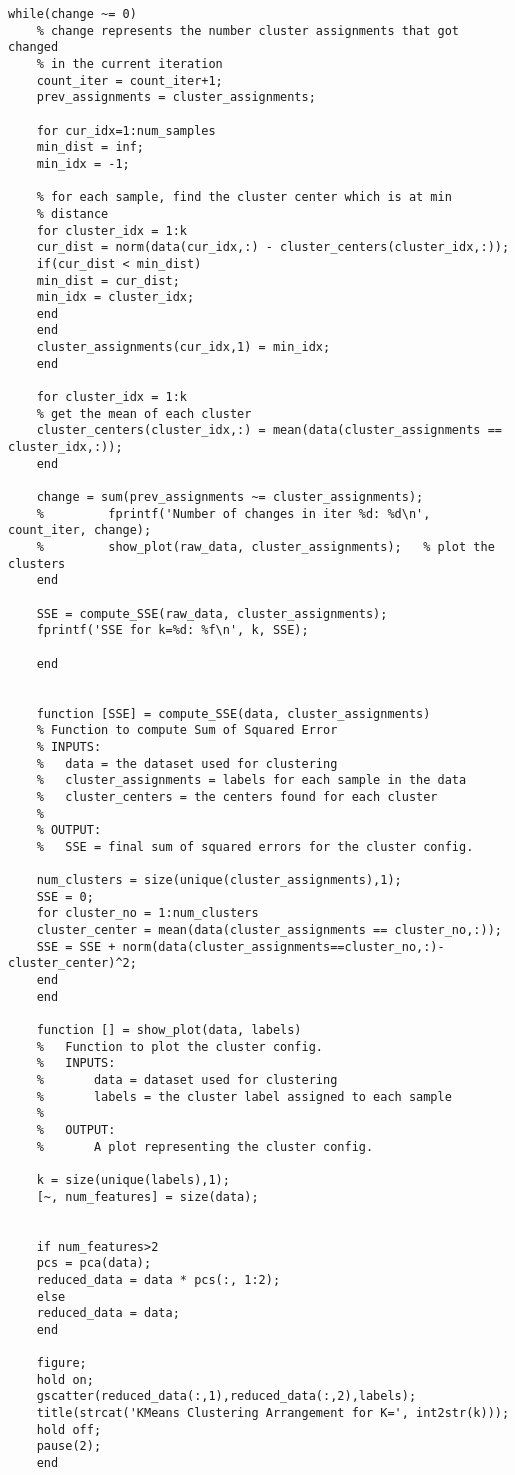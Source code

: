 \documentclass[11pt]{article}
\begin{document}
\begin{lstlisting}[style=Matlab-editor]
	while(change ~= 0)
	% change represents the number cluster assignments that got changed
	% in the current iteration
	count_iter = count_iter+1;
	prev_assignments = cluster_assignments;
	
	for cur_idx=1:num_samples
	min_dist = inf;
	min_idx = -1;
	
	% for each sample, find the cluster center which is at min
	% distance
	for cluster_idx = 1:k
	cur_dist = norm(data(cur_idx,:) - cluster_centers(cluster_idx,:));
	if(cur_dist < min_dist)
	min_dist = cur_dist;
	min_idx = cluster_idx;
	end
	end
	cluster_assignments(cur_idx,1) = min_idx;
	end
	
	for cluster_idx = 1:k
	% get the mean of each cluster
	cluster_centers(cluster_idx,:) = mean(data(cluster_assignments == cluster_idx,:));
	end
	
	change = sum(prev_assignments ~= cluster_assignments);
	%         fprintf('Number of changes in iter %d: %d\n', count_iter, change);
	%         show_plot(raw_data, cluster_assignments);   % plot the clusters
	end
	
	SSE = compute_SSE(raw_data, cluster_assignments);
	fprintf('SSE for k=%d: %f\n', k, SSE);
	
	end
	
	
	function [SSE] = compute_SSE(data, cluster_assignments)
	% Function to compute Sum of Squared Error
	% INPUTS:
	%   data = the dataset used for clustering
	%   cluster_assignments = labels for each sample in the data
	%   cluster_centers = the centers found for each cluster
	% 
	% OUTPUT:
	%   SSE = final sum of squared errors for the cluster config.
	
	num_clusters = size(unique(cluster_assignments),1);
	SSE = 0;
	for cluster_no = 1:num_clusters
	cluster_center = mean(data(cluster_assignments == cluster_no,:));
	SSE = SSE + norm(data(cluster_assignments==cluster_no,:)-cluster_center)^2;
	end
	end
	
	function [] = show_plot(data, labels)
	%   Function to plot the cluster config.
	%   INPUTS:
	%       data = dataset used for clustering
	%       labels = the cluster label assigned to each sample
	% 
	%   OUTPUT:
	%       A plot representing the cluster config.
	
	k = size(unique(labels),1);
	[~, num_features] = size(data);
	
	
	if num_features>2
	pcs = pca(data);
	reduced_data = data * pcs(:, 1:2);
	else
	reduced_data = data;
	end
	
	figure;
	hold on;
	gscatter(reduced_data(:,1),reduced_data(:,2),labels);
	title(strcat('KMeans Clustering Arrangement for K=', int2str(k)));
	hold off;
	pause(2);
	end
	
	
	
 \end{lstlisting}
\clearpage
\end{document}
